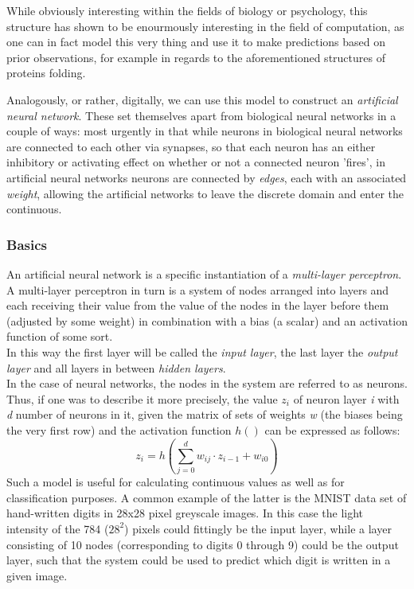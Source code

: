 While obviously interesting within the fields of biology or psychology, this structure has shown 
to be enourmously interesting in the field of computation, as one can in fact model this very 
thing and use it to make predictions based on prior observations, for example in regards to the 
aforementioned structures of proteins folding.

Analogously, or rather, digitally, we can use this model to construct an \textit{artificial 
neural network}.
These set themselves apart from biological neural networks in a couple of ways: most urgently in that while neurons in biological neural networks are connected to each other via synapses, so that each neuron has an either inhibitory or activating effect on whether or not a connected neuron 'fires', in artificial neural networks neurons are connected by \textit{edges}, each with an associated \textit{weight}, allowing the artificial networks to leave the discrete domain and enter the continuous.

\subsubsection{Basics}
An artificial neural network is a specific instantiation of a \textit{multi-layer perceptron}.
A multi-layer perceptron in turn is a system of nodes arranged into layers and each receiving their value from the value of the nodes in the layer before them (adjusted by some weight) in combination with a bias (a scalar) and an activation function of some sort. \\
In this way the first layer will be called the \textit{input layer}, the last layer the \textit{output layer} and all layers in between \textit{hidden layers}. \\
In the case of neural networks, the nodes in the system are referred to as neurons.
Thus, if one was to describe it more precisely, the value $z_i$ of neuron layer \textit{i} with \textit{d} number of neurons in it, given the matrix of sets of weights \textit{w} (the biases being the very first row) and the activation function $h()$ can be expressed as follows:
\[
z_i = h\left(\sum_{j=0}^d w_{ij}\cdot z_{i-1} + w_{i0}\right)
\]
Such a model is useful for calculating continuous values as well as for classification purposes. A common example of the latter is the MNIST data set of hand-written digits in 28x28 pixel greyscale images. In this case the light intensity of the 784 ($28^2$) pixels could fittingly be the input layer, while a layer consisting of 10 nodes (corresponding to digits 0 through 9) could be the output layer, such that the system could be used to predict which digit is written in a given image.

